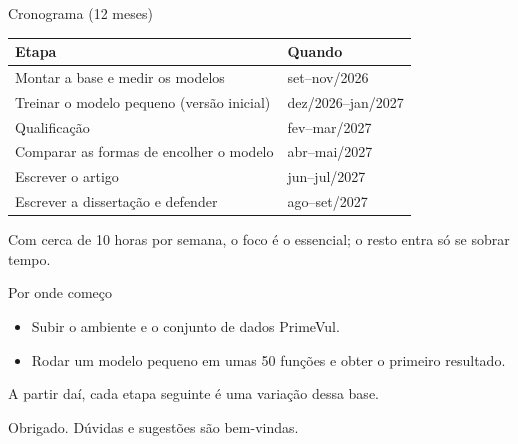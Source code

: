 \documentclass[aspectratio=169,11pt]{beamer}
\begin{document}
\begin{frame}{Cronograma (12 meses)}
  \centering
  \small
  \begin{tabular}{@{}ll@{}}
    \toprule
    \textbf{Etapa} & \textbf{Quando} \\
    \midrule
    Montar a base e medir os modelos      & set–nov/2026 \\
    Treinar o modelo pequeno (versão inicial) & dez/2026–jan/2027 \\
    Qualificação                          & fev–mar/2027 \\
    Comparar as formas de encolher o modelo & abr–mai/2027 \\
    Escrever o artigo                     & jun–jul/2027 \\
    Escrever a dissertação e defender     & ago–set/2027 \\
    \bottomrule
  \end{tabular}
  \vspace{1.2em}

  \footnotesize Com cerca de 10 horas por semana, o foco é o essencial;
  o resto entra só se sobrar tempo.
\end{frame}

\begin{frame}{Por onde começo}
  \begin{itemize}
    \item Subir o ambiente e o conjunto de dados PrimeVul.
    \item Rodar um modelo pequeno em umas 50 funções e obter o primeiro resultado.
  \end{itemize}
  \vspace{1.5em}
  A partir daí, cada etapa seguinte é uma variação dessa base.
  \vspace{2em}

  \centering Obrigado. Dúvidas e sugestões são bem-vindas.
\end{frame}
\end{document}
